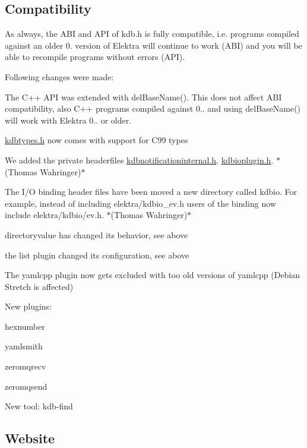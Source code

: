\subsection*{Compatibility}

As always, the A\+BI and A\+PI of kdb.\+h is fully compatible, i.\+e. programs compiled against an older 0. version of Elektra will continue to work (A\+BI) and you will be able to recompile programs without errors (A\+PI).

Following changes were made\+:


\begin{DoxyItemize}
\item The C++ A\+PI was extended with {\ttfamily del\+Base\+Name()}. This does not affect A\+BI compatibility, also C++ programs compiled against 0.. and using {\ttfamily del\+Base\+Name()} will work with Elektra 0.. or older.
\item {\ttfamily \hyperlink{kdbtypes_8h}{kdbtypes.\+h}} now comes with support for C99 types
\item We added the private headerfiles {\ttfamily \hyperlink{kdbnotificationinternal_8h}{kdbnotificationinternal.\+h}}, {\ttfamily \hyperlink{kdbioplugin_8h}{kdbioplugin.\+h}}. $\ast$(Thomas Wahringer)$\ast$
\item The I/O binding header files have been moved a new directory called {\ttfamily kdbio}. For example, instead of including {\ttfamily elektra/kdbio\+\_\+ev.\+h} users of the binding now include {\ttfamily elektra/kdbio/ev.\+h}. $\ast$(Thomas Wahringer)$\ast$
\item directoryvalue has changed its behavior, see above
\item the list plugin changed its configuration, see above
\item The yamlcpp plugin now gets excluded with too old versions of yamlcpp (Debian Stretch is affected)
\end{DoxyItemize}

New plugins\+:


\begin{DoxyItemize}
\item hexnumber
\item yamlsmith
\item zeromqrecv
\item zeromqsend
\end{DoxyItemize}

New tool\+: kdb-\/find

\subsection*{Website}

